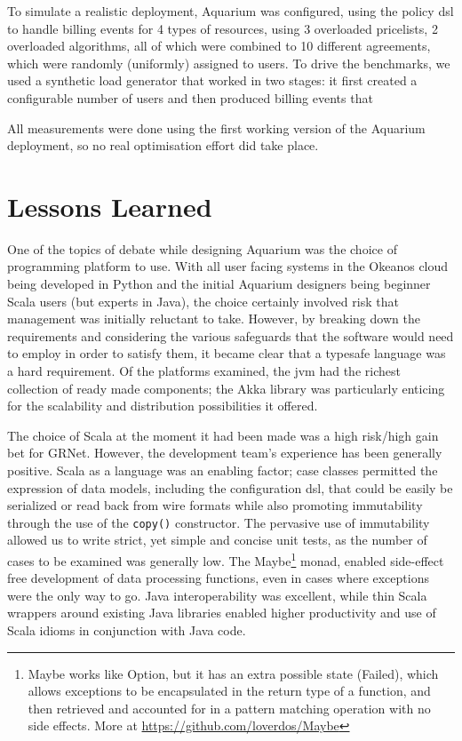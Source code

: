 \documentclass[preprint,10pt]{sigplanconf}
\begin{document}
To simulate a realistic deployment, Aquarium was configured, using the policy
{\sc dsl} to handle billing events for 4 types of resources, using 3 overloaded
pricelists, 2 overloaded algorithms, all of which were combined to 10 different
agreements, which were randomly (uniformly) assigned to users. To drive the
benchmarks, we used a synthetic load generator that worked in two stages: it
first created a configurable number of users and then produced billing events
that 


All measurements were done using the first working version of the
Aquarium deployment, so no real optimisation effort did take place. 


\section{Lessons Learned}

One of the topics of debate while designing Aquarium was the choice of
programming platform to use. With all user facing systems in the Okeanos cloud
being developed in Python and the initial Aquarium designers being beginner
Scala users (but experts in Java), the choice certainly involved risk that
management was initially reluctant to take. However, by breaking down the
requirements and considering the various safeguards that the software would
need to employ in order to satisfy them, it became clear that a
typesafe language was a hard requirement. Of the platforms examined, the {\sc
jvm} had the richest collection of ready made components; the Akka library was
particularly enticing for the scalability and distribution possibilities it
offered.

The choice of Scala at the moment it had been made was a high risk/high gain
bet for GRNet. However, the development team's experience has been generally
positive. Scala as a language was an enabling factor; case classes permitted
the expression of data models, including the configuration {\sc dsl}, that
could be easily be serialized or read back from wire formats while also
promoting immutability through the use of the \texttt{copy()} constructor. The
pervasive use of immutability allowed us to write strict, yet simple and
concise unit tests, as the number of cases to be examined was generally low.
The \textsf{Maybe}\footnote{\textsf{Maybe} works like \textsf{Option}, but it
has an extra possible state (\textsf{Failed}), which allows exceptions to be
encapsulated in the return type of a function, and then retrieved and accounted
for in a pattern matching operation with no side effects. More at
\url{https://github.com/loverdos/Maybe}} monad, enabled side-effect free
development of data processing functions, even in cases where exceptions were
the only way to go. Java interoperability was excellent, while thin Scala
wrappers around existing Java libraries enabled higher productivity and use of
Scala idioms in conjunction with Java code.
\end{document}
